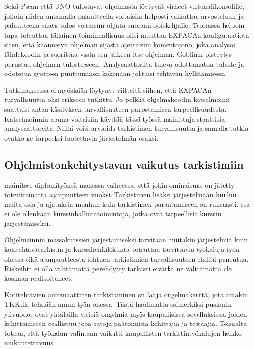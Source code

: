 Sekä Pscan että UNO tulostavat ohjelmasta löytyvät virheet virtuaalikonsolille,
jolloin niiden antamalla palautteella voitaisiin helposti vaikuttaa arvosteluun
ja palautteena saatu tulos voitaisiin ohjata suoraan opiskelijalle. Teoriassa
helpoin tapa toteuttaa tällainen toiminnallisuus olisi muuttaa EXPACAn
konfiguraatiota siten, että käännetyn ohjelman sijasta ajettaisiin komentojono,
joka analysoi lähdekoodin ja suorittaa vasta sen jälkeen itse ohjelman. Goblinin
pisteytys perustuu ohjelman tulosteeseen. Analysaattorilta tuleva odottamaton
tuloste ja odotetun syötteen puuttuminen kokonaan johtaisi tehtävän hylkäämiseen.

Tutkimuksessa ei myöskään löytynyt viitteitä siihen, että EXPACAn
turvallisuutta olisi erikseen tutkittu. Jo pelkkä ohjelmakoodin katselmointi
saattaisi antaa käsityksen turvallisuuteen panostamisen tarpeellisuudesta.
Katselmoinnin apuna voitaisiin käyttää tässä työssä mainittuja staattisia
analysaattoreita. Niillä voisi arvioida tarkistimen turvallisuutta ja samalla
tutkia ovatko ne tarpeeksi luotettavia järjestelmän osaksi.

\subsection{Ohjelmistonkehitystavan vaikutus tarkistimiin}

\citet{Hiisila2005} mainitsee diplomityönsä monessa vaiheessa, että jokin
ominaisuus on jätetty toteuttamatta ajanpuutteen vuoksi. Tarkistimen lisäksi
järjestelmään kuuluu muita osia ja ajatuksia muuhun kuin tarkistimen
parantamiseen on runsaasti. {\scmrobo}ssa ei ole ollenkaan
kurssinhallintatoimintoja, jotka ovat tarpeellisia kurssin järjestämiseksi.

Ohjelmoinnin massakurssien järjestämiseksi tarvitaan muitakin järjestelmiä
kuin kotitehtävätarkistin ja kurssihenkilökunta toteuttaa tarvittavia
työkaluja työn ohessa eikä ajanpuutteesta johtuen tarkistimien turvallisuuteen
ehditä paneutua. Riskeihin ei olla välttämättä perehdytty tarkasti eivätkä
ne välttämättä ole koskaan realisoituneet.

Kotitehtävien automaattinen tarkistaminen on laaja ongelmakenttä, jota ainakin
TKK:lla tehdään muun työn ohessa. Tästä huolimatta esimerkiksi puskurin
ylivuodot ovat yhtälailla yleisiä ongelmia myös kaupallisissa sovelluksissa,
joiden kehittämiseen osallistuu jopa satoja päätoimisia kehittäjiä ja
testaajia. Toisaalta \citet{Hiisila2005} toteaa, että työkalun valintaan
vaikutti kaupallisten tarkistintyökalujen heikko mukautettavuus.  

